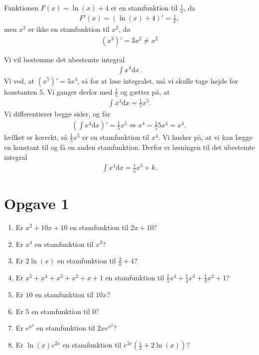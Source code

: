 \begin{exa}
Funktionen $F(x) = \ln(x) +4$ er en stamfunktion til $\frac{1}{x}$, da
\begin{align*}
F'(x) = (\ln(x) + 4)' = \frac{1}{x},
\end{align*}
men $x^3$ er ikke en stamfunktion til $x^2$, da
\begin{align*}
(x^3)' = 3x^2 \neq x^2
\end{align*}
\end{exa}
\begin{exa}
Vi vil bestemme det ubestemte integral
\begin{align*}
\int x^4 \text{d}x.
\end{align*}
Vi ved, at $(x^5)' = 5x^4$, så for at løse integralet, må vi skulle tage højde for konstanten $5$. Vi ganger derfor med $\frac{1}{5}$ og gætter på, at
\begin{align*}
\int x^4 \text{d}x = \frac{1}{5}x^5.
\end{align*}
Vi differentierer begge sider, og får
\begin{align*}
(\int x^4 \text{d}x)' = \frac{1}{5}x^5 \Leftrightarrow x^4 = \frac{1}{5}5x^4 = x^4,
\end{align*}
hvilket er korrekt, så $\frac{1}{5}x^5$ er en stamfunktion til $x^4$. Vi husker på, at vi kan lægge en konstant til og få en anden stamfunktion. Derfor er løsningen til det ubestemte integral
\begin{align*}
\int x^4 \text{d}x = \frac{1}{5}x^5+k.
\end{align*}
\end{exa}
\section*{Opgave 1}
\begin{enumerate}[label=\roman*)]
\item Er $x^2 + 10x + 10$ en stamfunktion til $2x+10$?
\item Er $x^4$ en stamfunktion til $x^3$?
\item Er $2\ln(x)$ en stamfunktion til $\frac{2}{x}+4$?
\item Er $x^5+x^4+x^3+x^2+x+1$ en stamfunktion til $\frac{1}{5}x^4+\frac{1}{4}x^3+\frac{1}{3}x^2+1$?
\item Er $10$ en stamfunktion til $10x$?
\item Er $5$ en stamfunktion til $0$?
\item Er $e^{x^2}$ en stamfunktion til $2xe^{x^2}$?
\item Er $\ln(x)e^{2x}$ en stamfunktion til $e^{2x}(\frac{1}{x}+2\ln(x))$?
\end{enumerate}
